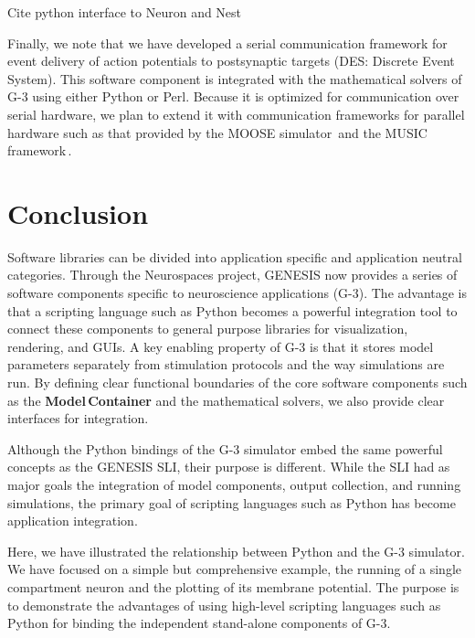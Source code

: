 \documentclass[12pt]{article}
\begin{document}
Cite python interface to Neuron and Nest

Finally, we note that we have developed a serial communication
framework for event delivery of action potentials to postsynaptic
targets (DES: Discrete Event System).  This software component is
integrated with the mathematical solvers of G-3 using either Python or
Perl.  Because it is optimized for communication over serial hardware,
we plan to extend it with communication frameworks for parallel
hardware such as that provided by the MOOSE
simulator\,\cite{ray08:_pymoos} and the MUSIC
framework\,\cite{ekeberg08:_music_multis_coord}.


\pagebreak
\section{Conclusion}

Software libraries can be divided into application specific and
application neutral categories.  Through the Neurospaces project, GENESIS now provides a
series of software components specific to neuroscience applications (G-3).
The advantage is that a scripting language such as Python becomes a
powerful integration tool to connect these components to general
purpose libraries for visualization, rendering, and GUIs.  A key
enabling property of G-3 is that it stores model parameters separately
from stimulation protocols and the way simulations are run.  By
defining clear functional boundaries of the core software components
such as the {\bf Model\,Container} and the mathematical solvers, we also
provide clear interfaces for integration.

Although the Python bindings of the G-3 simulator embed the same
powerful concepts as the GENESIS SLI, their purpose is different.
While the SLI had as major goals the integration of model components,
output collection, and running simulations, the primary goal of
scripting languages such as Python has become application integration.

Here, we have illustrated the relationship between Python and the G-3
simulator.  We have focused on a simple but comprehensive example, the
running of a single compartment neuron and the plotting of its
membrane potential. The purpose is to demonstrate the advantages of
using high-level scripting languages such as Python for binding the
independent stand-alone components of G-3.
\end{document}
